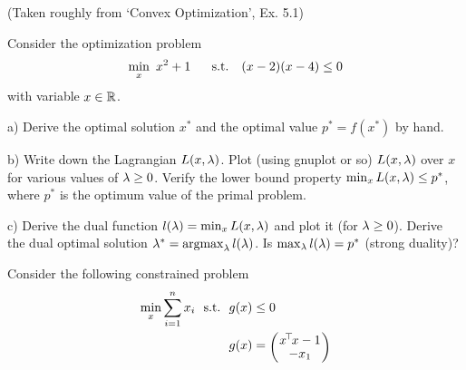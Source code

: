 

\renewcommand{\course}{Maths for Intelligent Systems}
\renewcommand{\coursedate}{Summer 2019}

\renewcommand{\exnum}{Exercise 8}

\exercises


\exercisestitle



(Taken roughly from `Convex Optimization', Ex. 5.1)

Consider the optimization problem
$$\min_x~ x^2 + 1 \quad~~\text{s.t.}~~~  (x-2)(x-4) \le 0$$
with variable $x \in {\mathbb{R}}$.

a) Derive the optimal solution $x^*$ and the optimal value
$p^*=f(x^*)$ by hand.


b) Write down the Lagrangian $L(x,\lambda)$. Plot (using gnuplot or so)
$L(x,\lambda)$ over $x$ for various values of $\lambda\ge 0$. Verify the
lower bound property $\min_x L(x,\lambda) \le p^*$, where $p^*$ is the
optimum value of the primal problem.


c) Derive the dual function $l(\lambda) = \min_x L(x,\lambda)$ and plot it (for $\lambda\ge
0$). Derive the dual optimal solution $\lambda^* = \operatorname*{argmax}_\lambda l(\lambda)$. Is
$\max_\lambda l(\lambda) = p^*$ (strong duality)?








Consider the following constrained problem
\begin{align}
\min_x \sum_{i=1}^n x_i \st& g(x) \le 0 \\
& g(x) = \mat{c}{x^\T x - 1 \\ -x_1}
\end{align}

